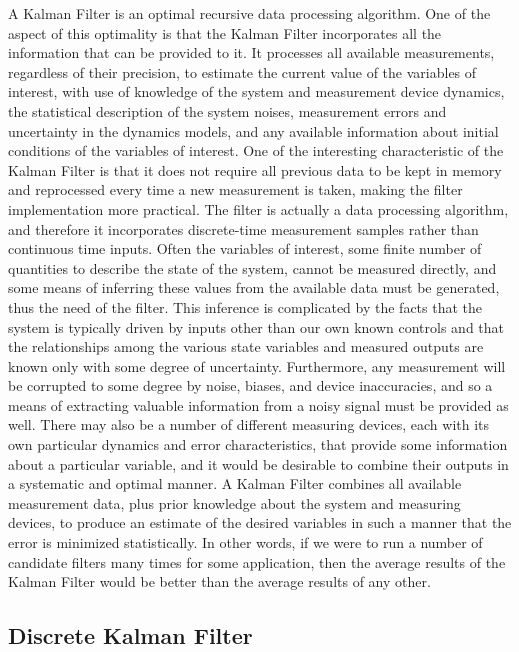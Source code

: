 A Kalman Filter is an optimal recursive data processing algorithm. One of the aspect of this optimality is that the Kalman Filter incorporates all the information that can be provided to it. It processes all available measurements, regardless of their precision, to estimate the current value of the variables of interest, with use of knowledge of the system and measurement device dynamics, the statistical description of the system noises, measurement errors and uncertainty in the dynamics models, and any available information about initial conditions of the variables of interest. One of the interesting characteristic of the Kalman Filter is that it does not require all previous data to be kept in memory and reprocessed every time a new measurement is taken, making the filter implementation more practical. The filter is actually a data processing algorithm, and therefore it incorporates discrete-time measurement samples rather than continuous time inputs. Often the variables of interest, some finite number of quantities to describe the state of the system, cannot be measured directly, and some means of inferring these values from the available data must be generated, thus the need of the filter. This inference is complicated by the facts that the system is typically driven by inputs other than our own known controls and that the relationships among the various state variables and measured outputs are known only with some degree of uncertainty. Furthermore, any measurement will be corrupted to some degree by noise, biases, and device inaccuracies, and so a means of extracting valuable information from a noisy signal must be provided as well. There may also be a number of different measuring devices, each with its own particular dynamics and error characteristics, that provide some information about a particular variable, and it would be desirable to combine their outputs in a systematic and optimal manner. A Kalman Filter combines all available measurement data, plus prior knowledge about the system and measuring devices, to produce an estimate of the desired variables in such a manner that the error is minimized statistically. In other words, if we were to run a number of candidate filters many times for some application, then the average results of the Kalman Filter would be better than the average results of any other. \cite{Maybeck1979}

\subsection{Discrete Kalman Filter}

